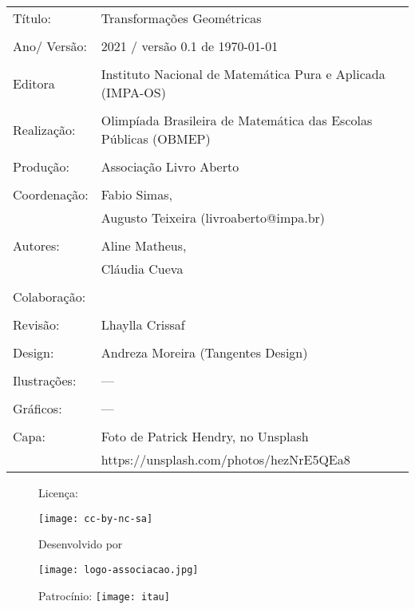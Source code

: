
\begin{tabular}{p{}p{}}
Título: & Transformações Geométricas\\
\\
Ano/ Versão: & 2021 / versão 0.1 de \today\\
\\
Editora & Instituto Nacional de Matem\'atica Pura e Aplicada (IMPA-OS)\\
\\
Realização:& Olimp\'iada Brasileira de Matem\'atica das Escolas P\'ublicas (OBMEP)\\
\\
Produção:& Associação Livro Aberto\\
\\
Coordenação: & Fabio Simas, \\
			&  Augusto Teixeira (livroaberto@impa.br)\\
\\
  Autores: & Aline Matheus, \\
  		   & Cláudia Cueva\\

        
\\
Colaboração: & \\
\\
Revisão: & Lhaylla Crissaf \\

\\
Design: & Andreza Moreira (Tangentes Design) \\
\\
  Ilustrações: & --- \\ 
\\
Gráficos: & ---\\
\\
  Capa: & Foto de Patrick Hendry, no Unsplash \\
  		& https://unsplash.com/photos/hezNrE5QEa8 \\

\end{tabular}
\vspace{.5cm}



\begin{figure}[b]
\begin{minipage}[l]{5cm}
\centering

{\large Licença:}

  \texttt{[image: cc-by-nc-sa]}
\end{minipage}\hfill
\begin{minipage}[c]{5cm}
\centering
{\large Desenvolvido por}

\texttt{[image: logo-associacao.jpg]}
\end{minipage}
\begin{minipage}[r]{5cm}
\centering

{\large Patrocínio:}
  \vspace{1em}
  \texttt{[image: itau]}
\end{minipage}
\end{figure}

